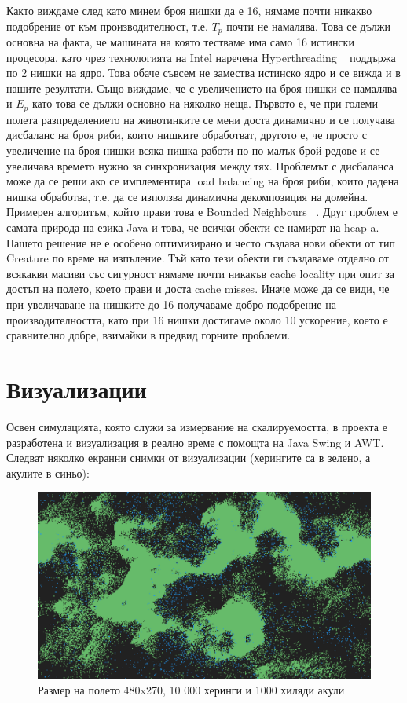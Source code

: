 \documentclass[12pt]{article}
\begin{document}
Както виждаме след като минем броя нишки да е 16, нямаме почти никакво подобрение от към
производителност, т.е. $T_p$ почти не намалява. Това се дължи основна на факта, че машината
на която тестваме има само 16 истински процесора, като чрез технологията на Intel наречена Hyperthreading ~\cite{hyperthreading}
поддържа по 2 нишки на ядро. Това обаче съвсем не замества истинско ядро и се вижда и в нашите резултати.
\bigbreak
Също виждаме, че с увеличението на броя нишки се намалява и $E_p$ като това се дължи основно
на няколко неща. Първото е, че при големи полета разпределението на животинките се мени доста динамично
и се получава дисбаланс на броя риби, които нишките обработват, другото е, че просто с увеличение
на броя нишки всяка нишка работи по по-малък брой редове и се увеличава времето нужно за синхронизация
между тях. Проблемът с дисбаланса може да се реши ако се имплементира load balancing на броя
риби, които дадена нишка обработва, т.е. да се използва динамична декомпозиция на домейна.
Примерен алгоритъм, който прави това е Bounded Neighbours ~\cite{bounded_neighbours}.
\bigbreak
Друг проблем е самата природа на езика Java и това, че всички обекти се намират на heap-a.
Нашето решение не е особено оптимизирано и често създава нови обекти от тип Creature по време на изпъление.
Тъй като тези обекти ги създаваме отделно от всякакви масиви със сигурност нямаме почти никакъв
cache locality при опит за достъп на полето, което прави и доста cache misses.
\bigbreak
Иначе може да се види, че при увеличаване на нишките до 16 получаваме добро подобрение на
производителността, като при 16 нишки достигаме около 10 ускорение, което е сравнително добре,
взимайки в предвид горните проблеми.

\newpage
\section{Визуализации}
Освен симулацията, която служи за измервание на скалируемостта,
в проекта е разработена и визуализация в реално време с помощта на Java Swing и AWT.
Следват няколко екранни снимки от визуализации (херингите са в зелено, а акулите в синьо):

\begin{figure}[H]
	\centering
	\includegraphics[width=1\textwidth]{screenshot-small.png}
	\caption{Размер на полето 480x270, 10 000 херинги и 1000 хиляди акули}
\end{figure}
\end{document}
